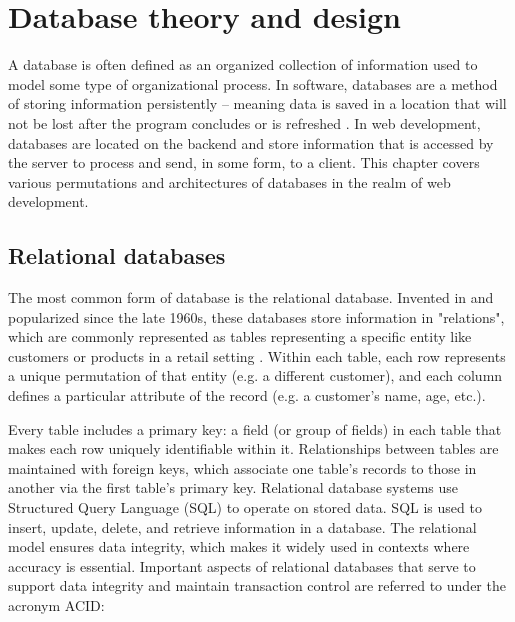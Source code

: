 \chapter{Database theory and design}\label{databases}

A database is often defined as an organized collection of information used to model some type of organizational process. In software, databases are a method of storing information persistently -- meaning data is saved in a location that will not be lost after the program concludes or is refreshed \cite{hernandez_database_2021}. In web development, databases are located on the backend and store information that is accessed by the server to process and send, in some form, to a client. This chapter covers various permutations and architectures of databases in the realm of web development.

\section{Relational databases}

The most common form of database is the relational database. Invented in and popularized since the late 1960s, these databases store information in "relations", which are commonly represented as tables representing a specific entity like customers or products in a retail setting \cite{hernandez_database_2021}. Within each table, each row represents a unique permutation of that entity (e.g. a different customer), and each column defines a particular attribute of the record (e.g. a customer's name, age, etc.).

Every table includes a primary key: a field (or group of fields) in each table that makes each row uniquely identifiable within it. Relationships between tables are maintained with foreign keys, which associate one table’s records to those in another via the first table's primary key. Relational database systems use Structured Query Language (SQL) to operate on stored data. SQL is used to insert, update, delete, and retrieve information in a database. The relational model ensures data integrity, which makes it widely used in contexts where accuracy is essential. Important aspects of relational databases that serve to support data integrity and maintain transaction control are referred to under the acronym ACID:


